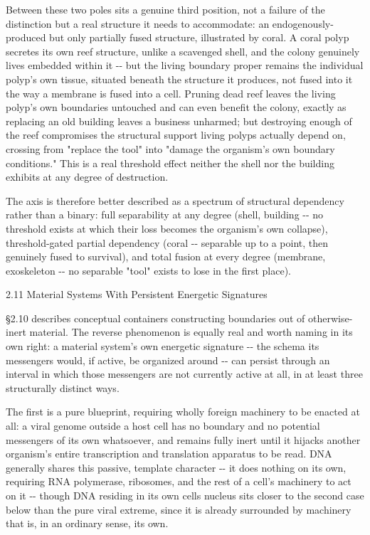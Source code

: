 \documentclass[
]{article}
\begin{document}
Between these two poles sits a genuine third position, not a failure of
the distinction but a real structure it needs to accommodate: an
endogenously-produced but only partially fused structure, illustrated by
coral. A coral polyp secretes its own reef structure, unlike a scavenged
shell, and the colony genuinely lives embedded within it -\/- but the
living boundary proper remains the individual polyp's own tissue,
situated beneath the structure it produces, not fused into it the way a
membrane is fused into a cell. Pruning dead reef leaves the living
polyp's own boundaries untouched and can even benefit the colony,
exactly as replacing an old building leaves a business unharmed; but
destroying enough of the reef compromises the structural support living
polyps actually depend on, crossing from "replace the tool" into "damage
the organism's own boundary conditions." This is a real threshold effect
neither the shell nor the building exhibits at any degree of
destruction.

The axis is therefore better described as a spectrum of structural
dependency rather than a binary: full separability at any degree (shell,
building -\/- no threshold exists at which their loss becomes the
organism's own collapse), threshold-gated partial dependency (coral -\/-
separable up to a point, then genuinely fused to survival), and total
fusion at every degree (membrane, exoskeleton -\/- no separable "tool"
exists to lose in the first place).

2.11 Material Systems With Persistent Energetic Signatures

§2.10 describes conceptual containers constructing boundaries out of
otherwise-inert material. The reverse phenomenon is equally real and
worth naming in its own right: a material system's own energetic
signature -\/- the schema its messengers would, if active, be organized
around -\/- can persist through an interval in which those messengers
are not currently active at all, in at least three structurally distinct
ways.

The first is a pure blueprint, requiring wholly foreign machinery to be
enacted at all: a viral genome outside a host cell has no boundary and
no potential messengers of its own whatsoever, and remains fully inert
until it hijacks another organism's entire transcription and translation
apparatus to be read. DNA generally shares this passive, template
character -\/- it does nothing on its own, requiring RNA polymerase,
ribosomes, and the rest of a cell's machinery to act on it -\/- though
DNA residing in its own cells nucleus sits closer to the second case
below than the pure viral extreme, since it is already surrounded by
machinery that is, in an ordinary sense, its own.
\end{document}
